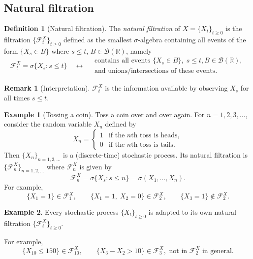 \documentclass[11pt]{article}
\theoremstyle{definition}
\newtheorem{definition}{Definition}[section]
\newtheorem{example}{Example}[section]
\newtheorem{remark}{Remark}[section]
\begin{document}
\subsection*{Natural filtration}

\begin{definition}[Natural filtration]
The \emph{natural filtration} of $X = \{X_t\}_{t \ge 0}$ is the filtration
$\{\mathcal{F}^X_t\}_{t \ge 0}$ defined as the smallest $\sigma$-algebra
containing all events of the form $\{X_s \in B\}$ where $s \le t$,
$B \in \mathcal{B}(\mathbb{R})$, namely
\[
  \mathcal{F}^X_t = \sigma\{X_s : s \le t\}
  \quad \longleftrightarrow \quad
  \begin{array}{l}
    \text{contains all events } \{X_s \in B\},\; s \le t, B \in \mathcal{B}(\mathbb{R}),\\
    \text{and unions/intersections of these events.}
  \end{array}
\]
\end{definition}

\begin{remark}[Interpretation]
$\mathcal{F}^X_t$ is the information available by observing $X_s$ for all
times $s \le t$.
\end{remark}

\begin{example}[Tossing a coin]
Toss a coin over and over again. For $n = 1, 2, 3, \dots$, consider the
random variable $X_n$ defined by
\[
  X_n = \begin{cases}
    1 & \text{if the } n\text{th toss is heads},\\
    0 & \text{if the } n\text{th toss is tails}.
  \end{cases}
\]
Then $\{X_n\}_{n=1,2,\dots}$ is a (discrete-time) stochastic process.
Its natural filtration is $\{\mathcal{F}^X_n\}_{n=1,2,\dots}$ where
$\mathcal{F}^X_n$ is given by
\[
  \mathcal{F}^X_n = \sigma\{X_s : s \le n\} = \sigma(X_1, \dots, X_n).
\]
For example,
\[
  \{X_1 = 1\} \in \mathcal{F}^X_1, \qquad
  \{X_1 = 1,\; X_2 = 0\} \in \mathcal{F}^X_2, \qquad
  \{X_3 = 1\} \notin \mathcal{F}^X_2.
\]
\end{example}

\begin{example}
Every stochastic process $\{X_t\}_{t \ge 0}$ is adapted to its own natural
filtration $\{\mathcal{F}^X_t\}_{t \ge 0}$.

For example,
\[
  \{X_{10} \le 150\} \in \mathcal{F}^X_{10}, \qquad
  \{X_3 - X_2 > 10\} \in \mathcal{F}^X_3, \text{ not in } \mathcal{F}^X_2
  \text{ in general.}
\]
\end{example}
\end{document}
